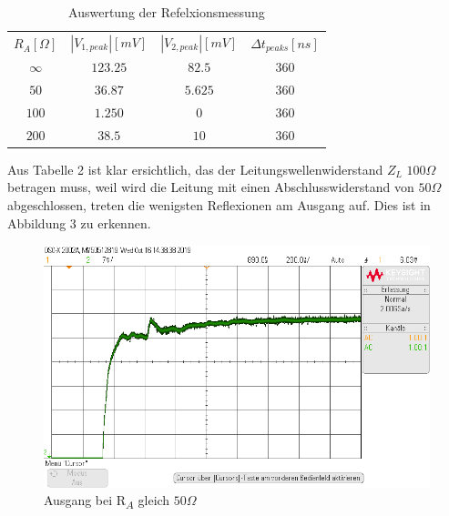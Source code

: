 \documentclass[a4paper,12pt]{article}
\begin{document}
	\newpage
	\begin{table}[h]
		\centering
		\begin{tabular}{|c|c|c|c|}
			\hline
			\multicolumn{1}{|c|}{\multirow{2}{*}{$R_A[\Omega]$}} & \multirow{2}{*}{$|V_{1,peak}|[mV]$} & \multirow{2}{*}{$|V_{2,peak}|[mV]$} & \multirow{2}{*}{$\Delta t_{peaks}[ns]$} \\
			\multicolumn{1}{|c|}{} &  &  &  \\ \hline
			\multirow{2}{*}{$\infty$} & \multirow{2}{*}{$123.25$} & \multirow{2}{*}{$82.5$} & \multirow{2}{*}{$360$} \\
			&  &  &  \\ \hline
			\multirow{2}{*}{$50$} & \multirow{2}{*}{$36.87$} & \multirow{2}{*}{$5.625$} & \multirow{2}{*}{$360$} \\
			&  &  &  \\ \hline
			\multirow{2}{*}{$100$} & \multirow{2}{*}{$1.250$} & \multirow{2}{*}{$0$} & \multirow{2}{*}{$360$} \\
			&  &  &  \\ \hline
			\multirow{2}{*}{$200$} & \multirow{2}{*}{$38.5$} & \multirow{2}{*}{$10$} & \multirow{2}{*}{$360$} \\
			&  &  &  \\ \hline
		\end{tabular}
		\caption{Auswertung der Refelxionsmessung}
	\end{table}
	\noindent
	Aus Tabelle 2 ist klar ersichtlich, das der Leitungswellenwiderstand $Z_L$ $100\Omega$ betragen muss, weil wird die Leitung mit einen Abschlusswiderstand von $50\Omega$ abgeschlossen, treten die wenigsten Reflexionen am Ausgang auf. Dies ist in Abbildung 3 zu erkennen.
	\begin{figure}[h]
		\centering
		\includegraphics[width=13cm]{img/Ra100}
		\caption{Ausgang bei R\textsubscript{$A$} gleich $50\Omega$}
	\end{figure}
	\newpage
\end{document}

